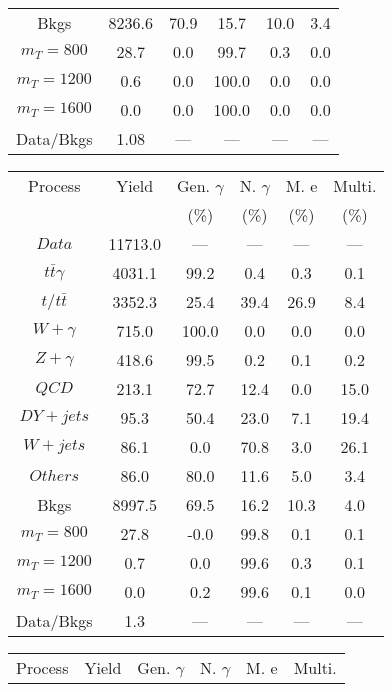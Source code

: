 \begin{figure}
\begin{minipage}[c]{0.32\textwidth}
{\begin{tabular}{cccccc}
Bkgs &  8236.6 &  70.9 &  15.7 &  10.0 &  3.4\\
$ m_{T} = 800 $ &  28.7 &  0.0 &  99.7 &  0.3 &  0.0\\
$ m_{T} = 1200 $ &  0.6 &  0.0 &  100.0 &  0.0 &  0.0\\
$ m_{T} = 1600 $ &  0.0 &  0.0 &  100.0 &  0.0 &  0.0\\
Data/Bkgs &  1.08 &  --- &  --- &  --- &  ---\\
\hline
\end{tabular}
}
\end{minipage}
\begin{minipage}[c]{0.32\textwidth}
\centering
\tiny{
\begin{tabular}{cccccc}
\hline
Process & Yield & Gen. $\gamma$ & N. $\gamma$ & M. e & Multi. \\
 &  & (\%) & (\%) & (\%) & (\%)  \\
\hline
                                                                      $ Data $ &  11713.0 &  --- &  --- &  --- &  ---\\
$ t\bar{t}\gamma $ &  4031.1 &  99.2 &  0.4 &  0.3 &  0.1\\
$ t/t\bar{t} $ &  3352.3 &  25.4 &  39.4 &  26.9 &  8.4\\
$ W+\gamma $ &  715.0 &  100.0 &  0.0 &  0.0 &  0.0\\
$ Z+\gamma $ &  418.6 &  99.5 &  0.2 &  0.1 &  0.2\\
$ QCD $ &  213.1 &  72.7 &  12.4 &  0.0 &  15.0\\
$ DY+jets $ &  95.3 &  50.4 &  23.0 &  7.1 &  19.4\\
$ W+jets $ &  86.1 &  0.0 &  70.8 &  3.0 &  26.1\\
$ Others $ &  86.0 &  80.0 &  11.6 &  5.0 &  3.4\\
Bkgs &  8997.5 &  69.5 &  16.2 &  10.3 &  4.0\\
$ m_{T} = 800 $ &  27.8 &  -0.0 &  99.8 &  0.1 &  0.1\\
$ m_{T} = 1200 $ &  0.7 &  0.0 &  99.6 &  0.3 &  0.1\\
$ m_{T} = 1600 $ &  0.0 &  0.2 &  99.6 &  0.1 &  0.0\\
Data/Bkgs &  1.3 &  --- &  --- &  --- &  ---\\
\hline
\end{tabular}
}
\end{minipage}
\begin{minipage}[c]{0.32\textwidth}
\centering
\tiny{
\begin{tabular}{cccccc}
\hline
Process & Yield & Gen. $\gamma$ & N. $\gamma$ & M. e & Multi. \\

\end{tabular}}
\end{minipage}
\end{figure}
